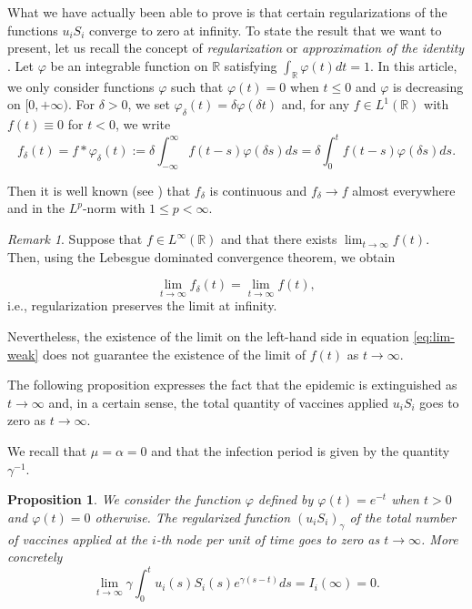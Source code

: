 \documentclass[a4paper,10pt]{article}
\newtheorem{prop}[thm]{Proposition}
\theoremstyle{remark}
\newtheorem{comentario}{Remark}
\begin{document}
What we have actually been able to prove is that certain regularizations of the functions $u_iS_i$ converge to zero at infinity. To state the result that we want to present, let us recall the concept of \emph{regularization} or \emph{approximation of the identity} \cite{EliasM.Stein120}. Let $\varphi$ be an integrable function on $\mathbb{R}$ satisfying $\int_\mathbb{R}\varphi(t)dt=1$. In this article, we only consider functions $\varphi$ such that $\varphi(t)=0$ when $t\leq 0$ and $\varphi$ is decreasing on $[0,+\infty)$. For $\delta>0$, we set $\varphi_\delta(t)=\delta\varphi(\delta t)$ and, for any $f\in L^1(\mathbb{R})$ with $f(t)\equiv 0$ for $t<0$, we write
\[
 f_{\delta}(t)=f\ast \varphi_\delta (t):= \delta\int_{-\infty}^\infty f(t-s)\varphi(\delta s)ds= \delta\int_0^t f(t-s)\varphi(\delta s)ds.
\]

Then it is well known (see \cite{EliasM.Stein120}) that $f_\delta$ is continuous and $f_\delta\to f$ almost everywhere and in the $L^p$-norm with $1\leq p<\infty$.

\begin{comentario}
 Suppose that $f\in L^\infty(\mathbb{R})$ and that there exists $\lim_{t\to\infty}f(t)$. Then, using the Lebesgue dominated convergence theorem, we obtain

 \begin{equation}\label{eq:lim-weak}
 \lim_{t\to\infty}f_\delta(t) =\lim_{t\to\infty}f(t),
\end{equation}
i.e., regularization preserves the limit at infinity.

Nevertheless, the existence of the limit on the left-hand side in equation \eqref{eq:lim-weak} does not guarantee the existence of the limit of $f(t)$ as $t\to\infty$.
\end{comentario}

The following proposition expresses the fact that the epidemic is extinguished as $t\to\infty$ and, in a certain sense, the total quantity of vaccines applied $u_iS_i$ goes to zero as $t\to\infty$.

We recall that $\mu=\alpha=0$ and that the infection period is given by the quantity $\gamma^{-1}$.

\begin{prop} We consider the function $\varphi$ defined by $\varphi(t)=e^{-t}$ when $t>0$ and $\varphi(t)=0$ otherwise. The regularized function $(u_iS_i)_\gamma$ of the total number of vaccines applied at the $i$-th node per unit of time goes to zero as $t\to\infty$. More concretely
\[
 \lim\limits_{t\to\infty}\gamma\int_0^t  u_i(s)S_i(s)
  e^{\gamma (s-t)}ds=I_i(\infty)=0.
\]


\end{prop}
\end{document}

